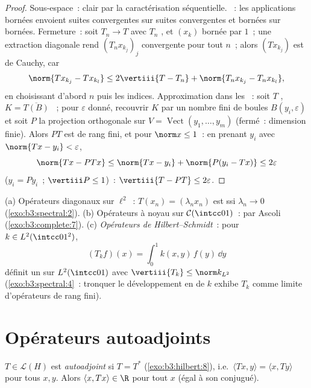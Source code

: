 \begin{proof}
Sous-espace~: clair par la caractérisation séquentielle.
~: les applications bornées envoient suites
convergentes sur suites convergentes et bornées sur bornées.
Fermeture~: soit $T_n \to T$ avec $T_n$ , et $(x_k)$
bornée par $1$~; une extraction diagonale rend
$(T_nx_{k_j})_j$ convergente pour tout $n$~; alors
$(Tx_{k_j})$ est de Cauchy, car
\[
\norm{Tx_{k_j} - Tx_{k_l}} \leq 2\vertiii{T - T_n} +
\norm{T_nx_{k_j} - T_nx_{k_l}} ,
\]
en choisissant d'abord $n$ puis les indices. Approximation
dans les ~: soit $T$ , $K =
\overline{T(B)}$ ~; pour $\varepsilon$ donné, recouvrir
$K$ par un nombre fini de boules $B(y_i, \varepsilon)$ et
soit $P$ la projection orthogonale sur $V =
\operatorname{Vect}(y_1, \dots, y_m)$ (fermé~: dimension
finie). Alors $PT$ est de rang fini, et pour $\norm x \leq
1$~: en prenant $y_i$ avec $\norm{Tx - y_i} < \varepsilon$,
\[
\norm{Tx - PTx} \leq \norm{Tx - y_i} + \norm{P(y_i - Tx)}
\leq 2\varepsilon
\]
($y_i = Py_i$~; $\vertiii P \leq 1$)~: $\vertiii{T - PT} \leq
2\varepsilon$.
\end{proof}

\begin{example}\label{ex:b3:spectral:examples}
(a) Opérateurs diagonaux sur $\ell^2$~: $T(x_n) =
(\lambda_nx_n)$ est  ssi $\lambda_n \to 0$
(\cref{exo:b3:spectral:2}).
(b) Opérateurs à noyau sur $\mathcal C(\intcc01)$~: 
par Ascoli (\cref{exo:b3:complete:7}).
(c) \emph{Opérateurs de Hilbert--Schmidt}~: pour $k \in L^2(\intcc01^2)$,
\[
(T_kf)(x) = \int_0^1k(x, y)\,f(y)\,\dd y
\]
définit un  sur $L^2(\intcc01)$ avec
$\vertiii{T_k} \leq \norm k_{L^2}$
(\cref{exo:b3:spectral:4}~: tronquer le développement en 
de $k$ exhibe $T_k$ comme limite d'opérateurs de rang fini).
\end{example}

\section{Opérateurs autoadjoints}

\begin{definition}\label{def:b3:spectral:selfadjoint}
$T \in \mathcal L(H)$ est \emph{autoadjoint} si $T = T^*$ (\cref{exo:b3:hilbert:8}), i.e.\
$\langle Tx, y\rangle = \langle x, Ty\rangle$ pour tous $x,
y$. Alors $\langle x, Tx\rangle \in \R$ pour tout $x$ (égal
à son conjugué).
\end{definition}

